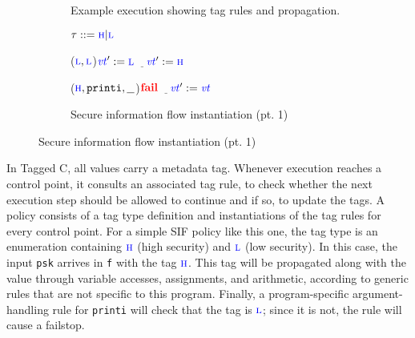 \documentclass{llncs}
\begin{document}
\begin{figure}[t]
\begin{subfigure}{0.7\textwidth}

  \caption{Example execution showing tag rules and propagation.}
  \label{fig:ex1}
  \end{subfigure}
  \begin{subfigure}{0.29\textwidth}
    \scriptsize
    \(\tau::=\textnormal{\color{blue} \sc h} | \textnormal{\color{blue} \sc l}\)

    \binoptexruleblock
        {\caseoftwo{\((\vt[_1],\vt[_2])\)}
          {(\(\textnormal{\color{blue} \sc l},\textnormal{\color{blue} \sc l}\))}{\(\mathit{\color{blue} vt}':=\textnormal{\color{blue} \sc l}\)}
          {\(\underline{~~~}\)}{\(\mathit{\color{blue} vt}':=\textnormal{\color{blue} \sc h}\)}}

    \argtexruleblock
        {\caseoftwo{\((\vt,\FN,\AN)\)}
          {(\(\textnormal{\color{blue} \sc h},\mathtt{printi},\underline{~~}\))}{\(\mathbf{\color{red} fail}\)}
          {\(\underline{~~~}\)}{\(\mathit{\color{blue} vt}':=\mathit{\color{blue} vt}\)}}
  
  \caption{Secure information flow instantiation (pt. 1)}
  \label{fig:example1rules}
  \end{subfigure}

\end{figure}

In Tagged C, all values carry a metadata tag. Whenever execution reaches a control point, it consults
an associated tag rule, to check whether the next execution step should be allowed to continue and
if so, to update the tags. A policy consists of a tag type definition and instantiations of the tag
rules for every control point. For a simple SIF policy like this one, the tag type is an enumeration
containing \(\textnormal{\color{blue} \sc h}\) (high security) and \(\textnormal{\color{blue} \sc l}\) (low security).
In this case, the input {\tt psk} arrives in {\tt f} with the tag \(\textnormal{\color{blue} \sc h}\).
This tag will be propagated along with the value through variable accesses,
assignments, and arithmetic, according to generic rules that are not specific to this program.
Finally, a program-specific argument-handling rule for {\tt printi} will check that the tag is
\(\textnormal{\color{blue} \sc l}\); since it is not, the rule will cause a failstop.
\end{document}
